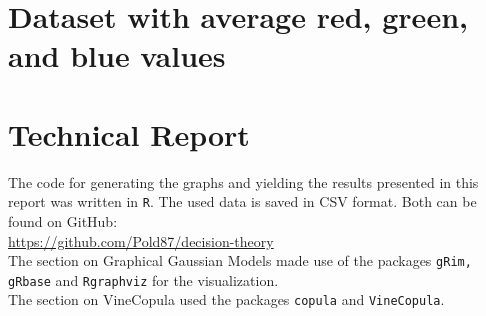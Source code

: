 \documentclass{article}
\begin{document}
\section{Dataset with average red, green, and blue values}
\begin{center}
\end{center}

\clearpage
\section{Technical Report}
\label{sec:technical}

The code for generating the graphs and yielding the results presented
in this report was written in \texttt{R}. The used data is saved in
CSV format. Both can be found on GitHub:\\
\noindent\url{https://github.com/Pold87/decision-theory}\\


The section on Graphical Gaussian Models made use of the packages
\texttt{gRim, gRbase} and \texttt{Rgraphviz} for the visualization.\\

The section on VineCopula used the packages \texttt{copula} and
\texttt{VineCopula}.
\end{document}
